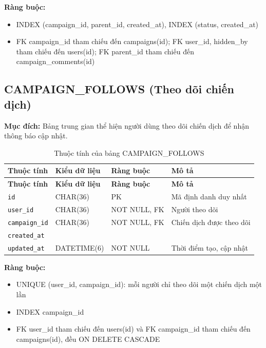 \textbf{Ràng buộc:}
\begin{itemize}
    \item INDEX (campaign\_\allowbreak{}id, parent\_\allowbreak{}id, created\_\allowbreak{}at), INDEX (status, created\_\allowbreak{}at)
    \item FK campaign\_\allowbreak{}id tham chiếu đến campaigns(id); FK user\_\allowbreak{}id, hidden\_\allowbreak{}by tham chiếu đến users(id); FK parent\_\allowbreak{}id tham chiếu đến campaign\_\allowbreak{}comments(id)
\end{itemize}

\subsection{CAMPAIGN\_\allowbreak{}FOLLOWS (Theo dõi chiến dịch)}

\textbf{Mục đích:} Bảng trung gian thể hiện người dùng theo dõi chiến dịch để nhận thông báo cập nhật.

{\small
\begin{longtable}{|P{3.2cm}|P{2.8cm}|P{2.2cm}|p{5.4cm}|}
    \caption{Thuộc tính của bảng CAMPAIGN\_\allowbreak{}FOLLOWS}
    \label{tab:campaign_follows} \\
    \hline
    \textbf{Thuộc tính} & \textbf{Kiểu dữ liệu} & \textbf{Ràng buộc} & \textbf{Mô tả} \\
    \hline
    \endfirsthead
    \hline
    \textbf{Thuộc tính} & \textbf{Kiểu dữ liệu} & \textbf{Ràng buộc} & \textbf{Mô tả} \\
    \hline
    \endhead

    \texttt{id} & CHAR(36) & PK & Mã định danh duy nhất \\
    \hline
    \texttt{user\_\allowbreak{}id} & CHAR(36) & NOT NULL, FK & Người theo dõi \\
    \hline
    \texttt{campaign\_\allowbreak{}id} & CHAR(36) & NOT NULL, FK & Chiến dịch được theo dõi \\
    \hline
    \texttt{created\_\allowbreak{}at} &  &  &  \\
    \hline
    \texttt{updated\_\allowbreak{}at} & DATETIME(6) & NOT NULL & Thời điểm tạo, cập nhật \\
    \hline
\end{longtable}
}

\textbf{Ràng buộc:}
\begin{itemize}
    \item UNIQUE (user\_\allowbreak{}id, campaign\_\allowbreak{}id): mỗi người chỉ theo dõi một chiến dịch một lần
    \item INDEX campaign\_\allowbreak{}id
    \item FK user\_\allowbreak{}id tham chiếu đến users(id) và FK campaign\_\allowbreak{}id tham chiếu đến campaigns(id), đều ON DELETE CASCADE
\end{itemize}

